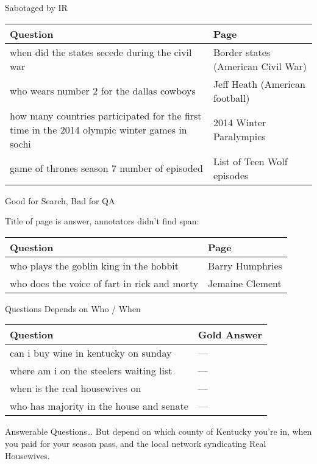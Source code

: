 \documentclass[xcolor=table]{beamer}
\begin{document}
\begin{frame}{Sabotaged by IR}

  \begin{small}
  \begin{tabular}{p{7cm}p{3cm}}
    \toprule
    Question & Page \\
    \hline
 when did the states secede during the civil war &  Border states (American Civil War) \\
 who wears number 2 for the dallas cowboys &  Jeff Heath (American football) \\
 how many countries participated for the first time in the 2014 olympic winter games in sochi & 2014 Winter Paralympics \\
 game of thrones season 7 number of episoded &  List of Teen Wolf episodes \\
 \bottomrule
  \end{tabular}
  \end{small}

\end{frame}

\begin{frame}{Good for Search, Bad for QA}

  Title of page is answer, annotators didn't find span:
  \begin{tabular}{p{7cm}p{3cm}}
    \toprule
    Question & Page \\
    \hline
  who plays the goblin king in the hobbit &  Barry Humphries  \\
  who does the voice of fart in rick and morty & Jemaine Clement   \\
 \bottomrule
  \end{tabular}
  

\end{frame}

\begin{frame}{Questions Depends on Who / When}
  \begin{tabular}{p{8cm}p{2cm}}
    \toprule
    Question & Gold Answer \\
    \hline
    can i buy wine in kentucky on sunday & --- \\
    where am i on the steelers waiting list & --- \\
    when is the real housewives on & --- \\
    who has majority in the house and senate & --- \\
    \bottomrule
  \end{tabular}  

  \pause

  \begin{block}{Answerable Questions\dots}
  But depend on which county of Kentucky you're in,
  when you paid for your season pass, and the local network
  syndicating Real Housewives.
  \end{block}
  
\end{frame}
\end{document}
